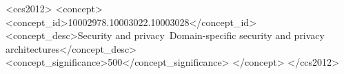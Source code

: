 

\begin{CCSXML}
<ccs2012>
   <concept>
       <concept_id>10002978.10003022.10003028</concept_id>
       <concept_desc>Security and privacy~Domain-specific security and privacy architectures</concept_desc>
       <concept_significance>500</concept_significance>
       </concept>
 </ccs2012>
\end{CCSXML}


